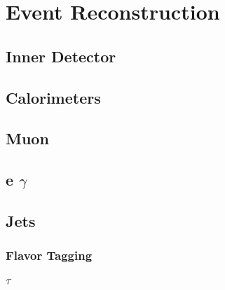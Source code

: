 \chapter{Event Reconstruction}\label{chap:reco}

	\section{Inner Detector}\label{sec:reco-ID}

	\section{Calorimeters}\label{sec:reco-calo}

	\section{Muon}\label{sec:reco-muon}

	\section{e $\gamma$}\label{sec:reco-egamma}

	\section{Jets}\label{sec:reco-jets}

		\subsection{Flavor Tagging}\label{ssec:flavor-tagging}

		\subsection{$\tau$}\label{ssec:reco-tau}

	\section{\Etm}\label{sec:reco-etmiss}
		